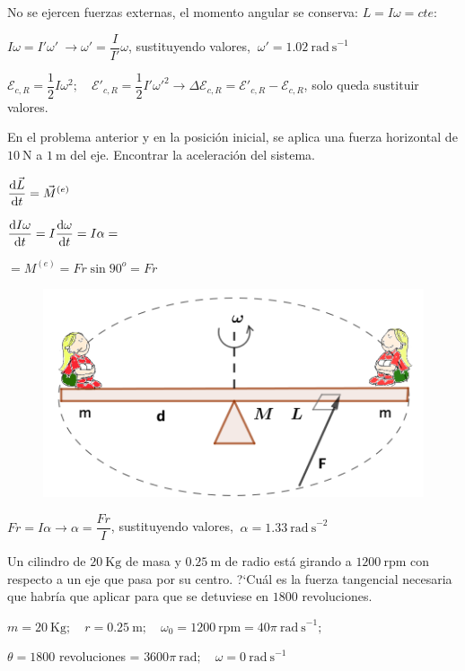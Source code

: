 No se ejercen fuerzas externas, el momento angular se conserva: $L=I\omega=cte$:

$I\omega=I'\omega' \ \to \omega'=\dfrac I{I'}\omega$, sustituyendo valores, $\ \omega' =1.02  \ \mathrm{rad\ s}^{-1}$

$\mathcal{E}_{c,R}=\dfrac 1 2 I \omega^2; \quad \mathcal{E'}_{c,R}=\dfrac 1 2 I' \omega'^2 \to \Delta \mathcal{E}_{c,R}= \mathcal{E'}_{c,R}- \mathcal{E}_{c,R}$, solo queda sustituir valores.

\begin{prob}
	En el problema anterior y en la posición inicial, se aplica una fuerza horizontal de $10\ \mathrm{N}$ a $1\ \mathrm{m}$ del eje. Encontrar la aceleración del sistema.
\end{prob}

\begin{multicols}{2}
$\displaystyle \dv{\vec L}{t}=\vec M^{(e)}$

$\displaystyle \dv{I\omega}{t}=I\dv{\omega}{t}=I\alpha=$

$=M^{(e)}=Fr\sin 90^o=Fr$
\begin{figure}[H]
	\centering
	\includegraphics[width=.5\textwidth]{imagenes/imagenes16/T16IM20.png}
\end{figure}	
\end{multicols}

$Fr=I\alpha \to \alpha = \dfrac{Fr}{I}$, sustituyendo valores, $\ \alpha=1.33 \ \mathrm{rad\ s}^{-2}$

\begin{prob}
Un cilindro de $20 \ \mathrm{Kg}$ de masa y $0.25\ \mathrm{m}$ de radio está girando a $1200\ \mathrm{rpm}$ con respecto a un eje que pasa por su centro. ?`Cuál es la fuerza tangencial necesaria que habría que aplicar para que se detuviese en $1800$ revoluciones.
\end{prob}

$m=20 \ \mathrm{Kg}; \quad r=0.25\ \mathrm{m}; \quad \omega_0=1200\ \mathrm{rpm}=40\pi\  \mathrm{rad\ s}^{-1};$

$\theta=1800$ revoluciones = $3600\pi \ \mathrm{rad};\quad \omega=0 \  \mathrm{rad\ s}^{-1}$

